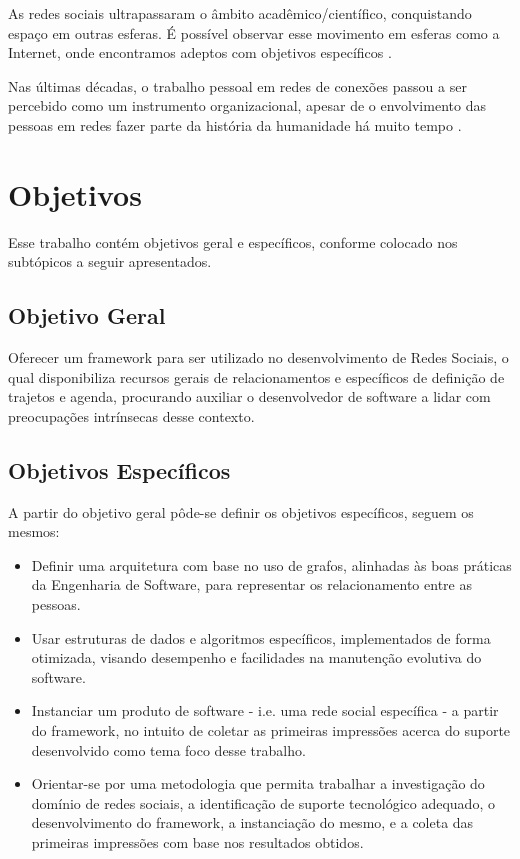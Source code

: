 As redes sociais ultrapassaram o âmbito acadêmico/científico, conquistando espaço em outras esferas. É possível observar esse movimento em esferas como a Internet, onde encontramos adeptos com objetivos específicos \cite{Tomae:Alcara:Chiara:2005}.

Nas últimas décadas, o trabalho pessoal em redes de conexões passou a ser percebido como um instrumento organizacional, apesar de o envolvimento das pessoas em redes fazer parte da história da humanidade há muito tempo \cite{Tomae:Alcara:Chiara:2005}.


\section{Objetivos}

Esse trabalho contém objetivos geral e específicos, conforme colocado nos subtópicos a seguir apresentados.

\subsection{Objetivo Geral}

Oferecer um framework para ser utilizado no desenvolvimento de Redes Sociais, o qual disponibiliza recursos gerais de relacionamentos e específicos de definição de trajetos e agenda, procurando auxiliar o desenvolvedor de software a lidar com preocupações intrínsecas desse contexto.

\subsection{Objetivos Específicos}

A partir do objetivo geral pôde-se definir os objetivos específicos, seguem os mesmos:

\begin{itemize}
	\item Definir uma arquitetura com base no uso de grafos, alinhadas às boas práticas da Engenharia de Software, para representar os relacionamento entre as pessoas.
	\item Usar estruturas de dados e algoritmos específicos, implementados de forma otimizada, visando desempenho e facilidades na manutenção evolutiva do software.
	\item Instanciar um produto de software - i.e. uma rede social específica - a partir do framework, no intuito de coletar as primeiras impressões acerca do suporte desenvolvido como tema foco desse trabalho.
	\item Orientar-se por uma metodologia que permita trabalhar a investigação do domínio de redes sociais, a identificação de suporte tecnológico adequado, o desenvolvimento do framework, a instanciação do mesmo, e a coleta das primeiras impressões com base nos resultados obtidos.
\end{itemize}

